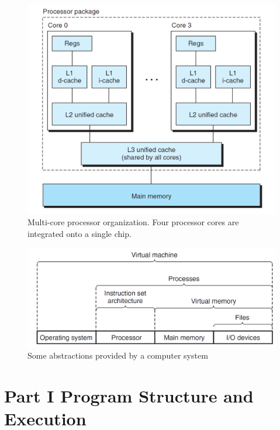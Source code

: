 \begin{figure}[h!]
    \centering
    \includegraphics[scale=0.5]{pic/section1and2/pic9.png}
    \caption{Multi-core processor organization. Four processor cores are integrated onto a single chip.}
\end{figure}


\begin{figure}[h!]
    \centering
    \includegraphics[scale=0.3]{pic/section1and2/pic10.png}
    \caption{Some abstractions provided by a computer system}
\end{figure}


\part{Part I Program Structure and Execution}

